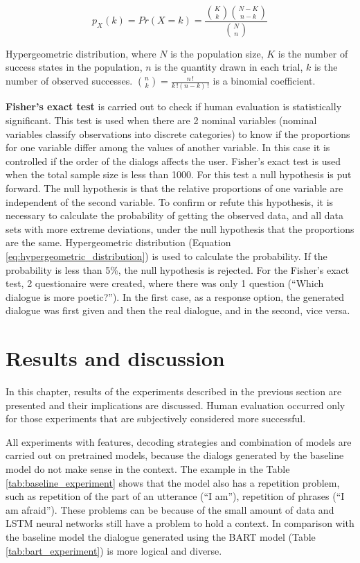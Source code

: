 \begin{eqfloat}
\begin{equation} \label{eq:hypergeometric_distribution}
p_X(k) = Pr(X=k) = \frac{\binom{K}{k} \binom{N-K}{n-k}}{\binom{N}{n}}
\end{equation}
\caption{Hypergeometric distribution, where $N$ is the population size, $K$ is the number of success states in the population, $n$ is the quantity drawn in each trial, $k$ is the number of observed successes. $\binom{n}{k} = \frac{n\,!}{k\,!(n-k)\,!}$ is a binomial coefficient.}
\end{eqfloat}

\textbf{Fisher's exact test} \cite{fisher1922interpretation} is carried out to check if human evaluation is statistically significant. This test is used when there are 2 nominal variables (nominal variables classify observations into discrete categories) to know if the proportions for one variable differ among the values of another variable. In this case it is controlled if the order of the dialogs affects the user. 
Fisher's exact test is used when the total sample size is less than 1000. For this test a null hypothesis is put forward. The null hypothesis is that the relative proportions of one variable are independent of the second variable. To confirm or refute this hypothesis, it is necessary to calculate the probability of getting the observed data, and all data sets with more extreme deviations, under the null hypothesis that the proportions are the same. Hypergeometric distribution (Equation \ref{eq:hypergeometric_distribution}) is used to calculate the probability. If the probability is less than 5\%, the null hypothesis is rejected. For the Fisher's exact test, 2 questionaire were created, where there was only 1 question (``Which dialogue is more poetic?''). In the first case, as a response option, the generated dialogue was first given and then the real dialogue, and in the second, vice versa.

\chapter{Results and discussion} \label{results_discuss}
In this chapter, results of the experiments described in the previous section are presented and their implications are discussed. Human evaluation occurred only for those experiments that are subjectively considered more successful.

All experiments with features, decoding strategies and combination of models are carried out on pretrained models, because the dialogs generated by the baseline model do not make sense in the context. The example in the Table \ref{tab:baseline_experiment} shows that the model also has a repetition problem, such as repetition of the part of an utterance (``I am''), repetition of phrases (``I am afraid''). These problems can be because of the small amount of data and LSTM neural networks still have a problem to hold a context. In comparison with the baseline model the dialogue generated using the BART model (Table \ref{tab:bart_experiment}) is more logical and diverse.

